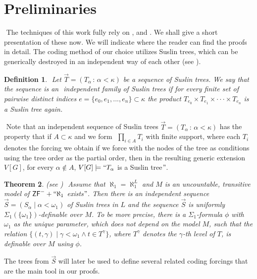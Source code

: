 \documentclass[a4paper,11pt]{article}
\newtheorem{theorem}{Theorem}[section]
\newtheorem{definition}[theorem]{Definition}
\newcommand{\ZF}{\mathsf{ZF}}
\begin{document}
    \section{Preliminaries}
    ﻿
    The techniques of this work fully rely on \cite{Reduction}, \cite{Uniformization} and \cite{Separation without reduction}. We shall give a short presentation of these now. We will indicate where the reader can find the proofs in detail.
    The coding method of our choice utilizes Suslin trees, which can be generically destroyed in an independent way of each other (see \cite{NS saturated and definable}). 
    ﻿
    \begin{definition}
    ﻿
     Let $\vec{T} = (T_{\alpha} \, : \, \alpha < \kappa)$ be a sequence of Suslin trees. We say that the sequence is an 
    ﻿
     independent family of Suslin trees if for every finite set of pairwise distinct indices $e= \{e_0, e_1,...,e_n\} \subset \kappa$ the product $T_{e_0} \times T_{e_1} \times \cdot \cdot \cdot \times T_{e_n}$ 
    ﻿
     is a Suslin tree again.
    ﻿
    \end{definition}
    ﻿
    Note that an independent sequence of Suslin trees $\vec{T} = (T_{\alpha} \, : \, \alpha < \kappa)$ has the property that if $A \subset \kappa$ and we form 
    ﻿
    $ \prod_{i \in A} T_i $
    ﻿
    with finite support, where each $T_i$ denotes the forcing we obtain if we force with the nodes of the tree  as conditions using the tree order as the partial order, then in the resulting generic extension $V[G]$, for every $\alpha \notin A$, $V[G] \models `` T_{\alpha}$ is a Suslin tree$"$. 
    ﻿
    \begin{theorem}\label{DefinitionIndependentSequence}(see \cite{Separation without reduction})
    ﻿
    Assume that $\aleph_1= \aleph_1^L$ and $M$ is an uncountable, transitive model of $\ZF^{-} + ``\aleph_1$ exists$"$.  Then there is an independent sequence $\vec{S} = ( S_{\alpha} \mid \alpha < \omega_1)$ of Suslin trees in $L$ and the sequence $\vec{S}$ is uniformly $\Sigma_1 ( \{ \omega_1 \} )$-definable over $M$. To be more precise, there is a $\Sigma_1$-formula $\phi$  with $\omega_1$ as the unique parameter, which does not depend on the model $M$, such that the relation $\{ (t,\gamma) \mid \gamma < \omega_1 \land t \in T^{\gamma}  \}$, where $T^{\gamma}$ denotes the $\gamma$-th level of $T$, is definable over $M$ using $\phi$. 
    ﻿
    \end{theorem}
The trees from $\vec{S}$ will later be used to define several related coding forcings that are the main tool in our proofs.
    ﻿
\end{document}
